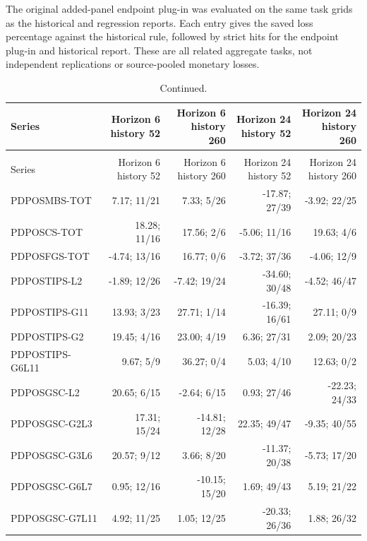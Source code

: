 \documentclass[11pt,a4paper]{article}
\begin{document}
The original added-panel endpoint plug-in was evaluated on the
same task grids as the historical and regression reports. Each entry gives
the saved loss percentage against the historical rule, followed by strict
hits for the endpoint plug-in and historical report. These are all related
aggregate tasks, not independent replications or source-pooled monetary losses.
\begingroup
\scriptsize
\setlength{\tabcolsep}{3pt}
\renewcommand{\arraystretch}{1.12}
\begin{longtable}{p{30mm}rrrr}
\caption{Every additional-panel endpoint-plug-in result. Fewer breaches do not guarantee a better score.}\\
\toprule
Series & \shortstack{Horizon 6\\history 52} & \shortstack{Horizon 6\\history 260} & \shortstack{Horizon 24\\history 52} & \shortstack{Horizon 24\\history 260} \\
\midrule
\endfirsthead
\caption[]{Continued.}\\
\toprule
Series & \shortstack{Horizon 6\\history 52} & \shortstack{Horizon 6\\history 260} & \shortstack{Horizon 24\\history 52} & \shortstack{Horizon 24\\history 260} \\
\midrule
\endhead
\bottomrule
\endfoot
PDPOSMBS-TOT & 7.17; 11/21 & 7.33; 5/26 & -17.87; 27/39 & -3.92; 22/25 \\
PDPOSCS-TOT & 18.28; 11/16 & 17.56; 2/6 & -5.06; 11/16 & 19.63; 4/6 \\
PDPOSFGS-TOT & -4.74; 13/16 & 16.77; 0/6 & -3.72; 37/36 & -4.06; 12/9 \\
PDPOSTIPS-L2 & -1.89; 12/26 & -7.42; 19/24 & -34.60; 30/48 & -4.52; 46/47 \\
PDPOSTIPS-G11 & 13.93; 3/23 & 27.71; 1/14 & -16.39; 16/61 & 27.11; 0/9 \\
PDPOSTIPS-G2 & 19.45; 4/16 & 23.00; 4/19 & 6.36; 27/31 & 2.09; 20/23 \\
PDPOSTIPS-G6L11 & 9.67; 5/9 & 36.27; 0/4 & 5.03; 4/10 & 12.63; 0/2 \\
PDPOSGSC-L2 & 20.65; 6/15 & -2.64; 6/15 & 0.93; 27/46 & -22.23; 24/33 \\
PDPOSGSC-G2L3 & 17.31; 15/24 & -14.81; 12/28 & 22.35; 49/47 & -9.35; 40/55 \\
PDPOSGSC-G3L6 & 20.57; 9/12 & 3.66; 8/20 & -11.37; 20/38 & -5.73; 17/20 \\
PDPOSGSC-G6L7 & 0.95; 12/16 & -10.15; 15/20 & 1.69; 49/43 & 5.19; 21/22 \\
PDPOSGSC-G7L11 & 4.92; 11/25 & 1.05; 12/25 & -20.33; 26/36 & 1.88; 26/32 \\
\end{longtable}
\endgroup
\end{document}
